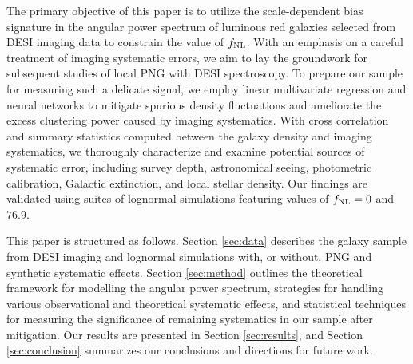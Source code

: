 The primary objective of this paper is to utilize the scale-dependent bias signature in the angular power spectrum of luminous red galaxies selected from DESI imaging data to constrain the value of $f_{\rm NL}$. With an emphasis on a careful treatment of imaging systematic errors, we aim to lay the groundwork for subsequent studies of local PNG with DESI spectroscopy. To prepare our sample for measuring such a delicate signal, we employ linear multivariate regression and neural networks to mitigate spurious density fluctuations and ameliorate the excess clustering power caused by imaging systematics. With cross correlation and summary statistics computed between the galaxy density and imaging systematics, we thoroughly characterize and examine potential sources of systematic error, including survey depth, astronomical seeing, photometric calibration, Galactic extinction, and local stellar density. Our findings are validated using suites of lognormal simulations featuring values of $f_{\rm NL}=0$ and $76.9$.

This paper is structured as follows. Section \ref{sec:data} describes the galaxy sample from DESI imaging and lognormal simulations with, or without, PNG and synthetic systematic effects. Section \ref{sec:method} outlines the theoretical framework for modelling the angular power spectrum, strategies for handling various observational and theoretical systematic effects, and statistical techniques for measuring the significance of remaining systematics in our sample after mitigation. Our results are presented in Section \ref{sec:results}, and Section \ref{sec:conclusion} summarizes our conclusions and directions for future work.